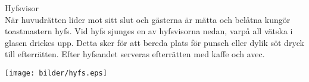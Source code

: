 \begin{flushleft}
{\Huge Hyfsvisor\\}
\vspace{1cm}
{\Large
När huvudrätten lider mot sitt slut och gästerna är mätta och belåtna
kungör toastmastern hyfs. Vid hyfs sjunges en av
hyfsvisorna nedan, varpå all vätska i glasen drickes upp. Detta sker för att bereda plats för punsch eller dylik söt dryck till
efterrätten. Efter hyfsandet serveras efterrätten med kaffe och avec.}
\end{flushleft}

\vspace{2cm}
\begin{center}
\texttt{[image: bilder/hyfs.eps]}
\end{center}
\newpage

